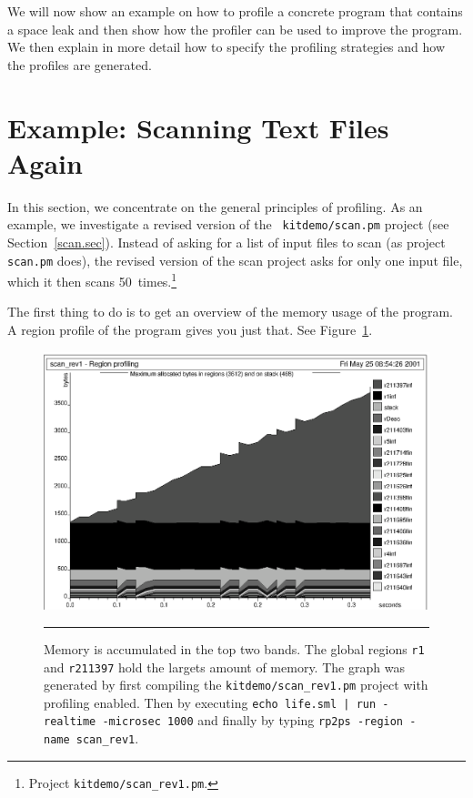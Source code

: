 \documentclass[12pt]{book}
\begin{document}
We will now show an example on how to profile a concrete program that
contains a space leak and then show how the profiler can be used to
improve the program. We then explain in more detail how to specify the
profiling strategies and how the profiles are generated.

\section{Example: Scanning Text Files Again}

In this section, we concentrate on the general principles of
profiling. As an example, we investigate a revised version of the {\tt
  kitdemo/scan.pm} project (see Section~\ref{scan.sec}). Instead of
asking for a list of input files to scan (as project \texttt{scan.pm}
does), the revised version of the scan project asks for only one input
file, which it then scans
%
50~times.\footnote{Project {\tt kitdemo/scan\_rev1.pm}.}

The first thing to do is to get an overview of the memory usage of the
program. A region profile of the program gives you just that. See
Figure~\ref{scan_rev1_1.fig}.
\begin{figure}
\begin{center}
  \includegraphics{scan_rev1_1.ps}
\end{center}
\caption{Memory is accumulated in the top two
  bands. The global regions \texttt{r1} and \texttt{r211397} hold the
  largets amount of memory. The graph was generated by first
  compiling the {\tt kitdemo/scan\_rev1.pm} project with profiling
  enabled. Then by executing \texttt{echo life.sml | run -realtime -microsec 1000} and finally by
  typing \texttt{rp2ps -region -name scan\_rev1}.}
\label{scan_rev1_1.fig}
\medskip\hrule
\end{figure}
\end{document}
